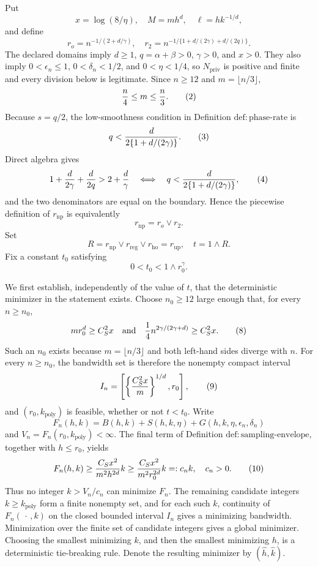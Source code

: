 Put
\[
 x=\log(8/\eta),\quad M=mh^d,\quad \ell=hk^{-1/d},
\]
and define
\[
 r_o=n^{-1/(2+d/\gamma)},
 \quad
 r_2=n^{-1/\{1+d/(2\gamma)+d/(2q)\}}.
\tag{1}
\]
The declared domains imply \(d\ge1\), \(q=\alpha+\beta>0\), \(\gamma>0\), and \(x>0\).  They also imply \(0<\epsilon_n\le1\), \(0<\delta_n<1/2\), and \(0<\eta<1/4\), so \(N_{\mathrm{priv}}\) is positive and finite and every division below is legitimate.  Since \(n\ge12\) and \(m=\lfloor n/3\rfloor\),
\[
 {n\over4}\le m\le {n\over3}.
\tag{2}
\]
Because \(s=q/2\), the low-smoothness condition in Definition \(\mathrm{def{:}phase\text{-}rate}\) is
\[
 q<{d\over2\{1+d/(2\gamma)\}}.
\tag{3}
\]
Direct algebra gives
\[
 1+{d\over2\gamma}+{d\over2q}>2+{d\over\gamma}
 \quad\Longleftrightarrow\quad
 q<{d\over2\{1+d/(2\gamma)\}},
\tag{4}
\]
and the two denominators are equal on the boundary.  Hence the piecewise definition of \(r_{\mathrm{np}}\) is equivalently
\[
 r_{\mathrm{np}}=r_o\vee r_2.
\tag{5}
\]
Set
\[
 R=r_{\mathrm{np}}\vee r_{\mathrm{reg}}\vee r_{\mathrm{ho}}
   =r_{\mathrm{up}},
 \quad
 t=1\wedge R.
\tag{6}
\]
Fix a constant \(t_0\) satisfying
\[
 0<t_0<1\wedge r_0^\gamma.
\tag{7}
\]

We first establish, independently of the value of \(t\), that the deterministic minimizer in the statement exists.  Choose \(n_0\ge12\) large enough that, for every \(n\ge n_0\),
\[
 mr_0^d\ge C_S^2x
 \quad\text{and}\quad
 {1\over4}n^{2\gamma/(2\gamma+d)}\ge C_S^2x.
\tag{8}
\]
Such an \(n_0\) exists because \(m=\lfloor n/3\rfloor\) and both left-hand sides diverge with \(n\).  For every \(n\ge n_0\), the bandwidth set is therefore the nonempty compact interval
\[
 I_n=\left[\left\{{C_S^2x\over m}\right\}^{1/d},r_0\right],
\tag{9}
\]
and \((r_0,k_{\mathrm{poly}})\) is feasible, whether or not \(t<t_0\).  Write
\[
 F_n(h,k)=B(h,k)+S(h,k,\eta)
       +G(h,k,\eta,\epsilon_n,\delta_n)
\]
and \(V_n=F_n(r_0,k_{\mathrm{poly}})<\infty\).  The final term of Definition \(\mathrm{def{:}sampling\text{-}envelope}\), together with \(h\le r_0\), yields
\[
 F_n(h,k)
 \ge {C_Sx^2\over m^2h^{2d}}k
 \ge {C_Sx^2\over m^2r_0^{2d}}k
 =:c_nk,
 \quad c_n>0.
\tag{10}
\]
Thus no integer \(k>V_n/c_n\) can minimize \(F_n\).  The remaining candidate integers \(k\ge k_{\mathrm{poly}}\) form a finite nonempty set, and for each such \(k\), continuity of \(F_n(\,\cdot\,,k)\) on the closed bounded interval \(I_n\) gives a minimizing bandwidth.  Minimization over the finite set of candidate integers gives a global minimizer.  Choosing the smallest minimizing \(k\), and then the smallest minimizing \(h\), is a deterministic tie-breaking rule.  Denote the resulting minimizer by \((\widehat h,\widehat k)\).

